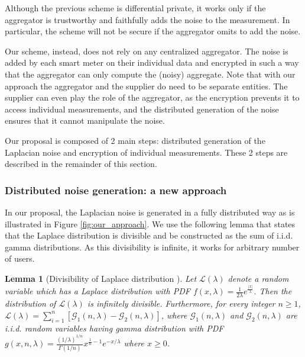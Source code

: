 \documentclass[11pt,a4paper]{article}
\theoremstyle{plain}
\theoremstyle{plain}
\theoremstyle{plain}
\theoremstyle{plain}
\newtheorem{lemma}{Lemma}
\theoremstyle{nonumberplain} \theoremseparator{}
\begin{document}
Although the previous scheme is differential private, it works only if the aggregator is trustworthy and faithfully adds the noise to the measurement. In particular, the scheme will not be secure if the aggregator omits to add the noise. 

Our scheme, instead, does not rely on any centralized aggregator. The noise is added by each smart meter on their individual data and encrypted in such a way that the aggregator can only compute the (noisy) aggregate. Note that with our approach the aggregator and the supplier do need to be separate entities. The supplier can even play the role of the aggregator, as the encryption prevents it to access individual measurements, and the distributed generation of the noise ensures that it cannot manipulate the noise.

Our proposal is composed of 2 main steps: distributed generation of the Laplacian noise and encryption of individual measurements. These 2 steps are described in the remainder of this section.


\subsubsection{Distributed noise generation: a new approach}
In our proposal, the Laplacian noise is generated in a fully distributed way as is illustrated in Figure \ref{fig:our_approach}.  We use
the following lemma that states that the Laplace distribution is divisible and be constructed as the sum of i.i.d. gamma distributions. As this divisibility is infinite, it works for arbitrary number of users.   

\begin{lemma}[Divisibility of Laplace distribution \cite{kotz01book}]
\label{lem:gamma}
Let $\mathcal{L}(\lambda)$ denote a random variable which has a Laplace distribution with PDF $f(x,\lambda) = \frac{1}{2\lambda} e^{\frac{|x|}{\lambda}}$. Then the distribution of $\mathcal{L}(\lambda)$ is infinitely divisible. Furthermore, for every integer $n \geq 1$, $\mathcal{L}(\lambda) = \sum_{i=1}^{n} [\mathcal{G}_{1}(n, \lambda) - \mathcal{G}_{2}(n, \lambda)]$, where $\mathcal{G}_{1}(n, \lambda)$ and $\mathcal{G}_{2}(n, \lambda)$ are i.i.d. random variables having gamma distribution with PDF $g(x,n,\lambda) = \frac{(1/\lambda)^{1/n}}{\Gamma(1/n)} x^{\frac{1}{n}-1}e^{-x/\lambda}$ where $x \geq 0$.  
\end{lemma}
\end{document}
